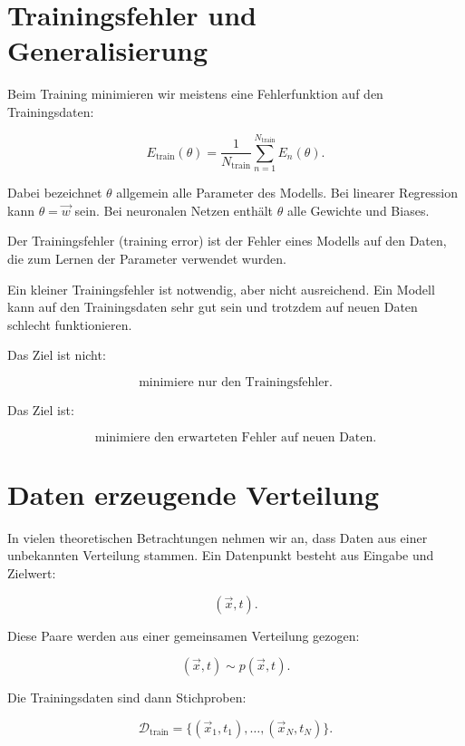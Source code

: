 \section{Trainingsfehler und Generalisierung}

Beim Training minimieren wir meistens eine Fehlerfunktion auf den Trainingsdaten:

\[
    E_{\mathrm{train}}(\theta)
    =
    \frac{1}{N_{\mathrm{train}}}
    \sum_{n=1}^{N_{\mathrm{train}}}
    E_n(\theta).
\]

Dabei bezeichnet \(\theta\) allgemein alle Parameter des Modells.
Bei linearer Regression kann \(\theta=\vec{w}\) sein.
Bei neuronalen Netzen enthält \(\theta\) alle Gewichte und Biases.

\begin{definitionbox}
Der Trainingsfehler (training error) ist der Fehler eines Modells auf den Daten, die zum Lernen der Parameter verwendet wurden.
\end{definitionbox}

Ein kleiner Trainingsfehler ist notwendig, aber nicht ausreichend.
Ein Modell kann auf den Trainingsdaten sehr gut sein und trotzdem auf neuen Daten schlecht funktionieren.

\begin{conceptbox}
Das Ziel ist nicht:

\[
    \text{minimiere nur den Trainingsfehler}.
\]

Das Ziel ist:

\[
    \text{minimiere den erwarteten Fehler auf neuen Daten}.
\]
\end{conceptbox}

\section{Daten erzeugende Verteilung}

In vielen theoretischen Betrachtungen nehmen wir an, dass Daten aus einer unbekannten Verteilung stammen.
Ein Datenpunkt besteht aus Eingabe und Zielwert:

\[
    (\vec{x},t).
\]

Diese Paare werden aus einer gemeinsamen Verteilung gezogen:

\[
    (\vec{x},t)
    \sim
    p(\vec{x},t).
\]

Die Trainingsdaten sind dann Stichproben:

\[
    \mathcal{D}_{\mathrm{train}}
    =
    \{(\vec{x}_1,t_1),\dots,(\vec{x}_N,t_N)\}.
\]

